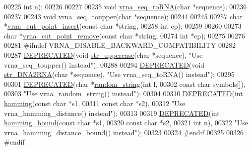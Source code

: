 \begin{DoxyCode}
00225                                 \textcolor{keywordtype}{int}         n);
00226 
00227 
00235 \textcolor{keywordtype}{void} \mbox{\hyperlink{group__string__utils_gacfed92cba77064f6c743f9118d079bfc}{vrna\_seq\_toRNA}}(\textcolor{keywordtype}{char} *sequence);
00236 
00237 
00243 \textcolor{keywordtype}{void} \mbox{\hyperlink{group__string__utils_ga4f44dca03c9d708d68e64c0610bb9091}{vrna\_seq\_toupper}}(\textcolor{keywordtype}{char} *sequence);
00244 
00245 
00257 \textcolor{keywordtype}{char} *\mbox{\hyperlink{group__string__utils_ga74f05ece32ea73b59f84a7452afd5fae}{vrna\_cut\_point\_insert}}(\textcolor{keyword}{const} \textcolor{keywordtype}{char}  *\textcolor{keywordtype}{string},
00258                             \textcolor{keywordtype}{int}         cp);
00259 
00260 
00273 \textcolor{keywordtype}{char} *\mbox{\hyperlink{group__string__utils_ga1fbd821d4408cc5f1dd9d12c15e092cb}{vrna\_cut\_point\_remove}}(\textcolor{keyword}{const} \textcolor{keywordtype}{char}  *\textcolor{keywordtype}{string},
00274                             \textcolor{keywordtype}{int}         *cp);
00275 
00276 
00281 \textcolor{preprocessor}{#ifndef VRNA\_DISABLE\_BACKWARD\_COMPATIBILITY}
00282 
00287 \mbox{\hyperlink{string__utils_8h_aab347a3c03fbe8e7319551b9fa0cce4a}{DEPRECATED}}(\textcolor{keywordtype}{void}  \mbox{\hyperlink{string__utils_8h_a17b796b806f96b70382077fb5bc519bb}{str\_uppercase}}(\textcolor{keywordtype}{char} *sequence), \textcolor{stringliteral}{"Use vrna\_seq\_toupper() instead"});
00288 
00294 \mbox{\hyperlink{string__utils_8h_aab347a3c03fbe8e7319551b9fa0cce4a}{DEPRECATED}}(\textcolor{keywordtype}{void} \mbox{\hyperlink{string__utils_8h_ad3f18dd83f958f18b2f26ecb99305208}{str\_DNA2RNA}}(\textcolor{keywordtype}{char} *sequence), \textcolor{stringliteral}{"Use vrna\_seq\_toRNA() instead"});
00295 
00301 \mbox{\hyperlink{string__utils_8h_aab347a3c03fbe8e7319551b9fa0cce4a}{DEPRECATED}}(\textcolor{keywordtype}{char} *\mbox{\hyperlink{string__utils_8h_a1b95eac365a021572e1c37e5993a89be}{random\_string}}(\textcolor{keywordtype}{int}        l,
00302                                \textcolor{keyword}{const} \textcolor{keywordtype}{char} symbols[]),
00303 \textcolor{stringliteral}{"Use vrna\_random\_string() instead"});
00304 
00310 \mbox{\hyperlink{string__utils_8h_aab347a3c03fbe8e7319551b9fa0cce4a}{DEPRECATED}}(\textcolor{keywordtype}{int} \mbox{\hyperlink{string__utils_8h_ad9dc7bfc9aa664dc6698f17ce07fc7e7}{hamming}}(\textcolor{keyword}{const} \textcolor{keywordtype}{char} *s1,
00311                        \textcolor{keyword}{const} \textcolor{keywordtype}{char} *s2),
00312 \textcolor{stringliteral}{"Use vrna\_hamming\_distance() instead"});
00313 
00319 \mbox{\hyperlink{string__utils_8h_aab347a3c03fbe8e7319551b9fa0cce4a}{DEPRECATED}}(\textcolor{keywordtype}{int} \mbox{\hyperlink{string__utils_8h_a96d3c36717d624514055ce201cab1542}{hamming\_bound}}(\textcolor{keyword}{const} \textcolor{keywordtype}{char} *s1,
00320                              \textcolor{keyword}{const} \textcolor{keywordtype}{char} *s2,
00321                              \textcolor{keywordtype}{int}        n),
00322 \textcolor{stringliteral}{"Use vrna\_hamming\_distance\_bound() instead"});
00323 
00324 \textcolor{preprocessor}{#endif}
00325 
00326 \textcolor{preprocessor}{#endif}
\end{DoxyCode}
